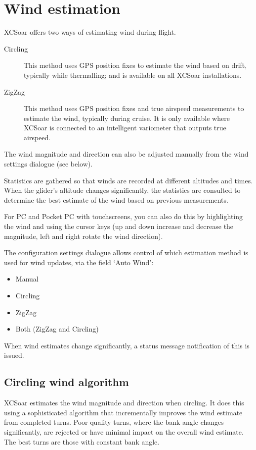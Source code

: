 \section{Wind estimation}\label{sec:wind-estimation}

XCSoar offers two ways of estimating wind during flight.
\begin{description}
\item[Circling]  This method uses GPS position fixes to estimate the wind
  based on drift, typically while thermalling; and is available on all
  XCSoar installations.
\item[ZigZag]  This method uses GPS position fixes and true airspeed measurements
  to estimate the wind, typically during cruise.  It is only available where
  XCSoar is connected to an intelligent variometer that outputs true airspeed.
\end{description}

The wind magnitude and direction can also be adjusted manually from the
wind settings dialogue (see below).  

Statistics are gathered so that winds are recorded at different
altitudes and times.  When the glider's altitude changes significantly,
the statistics are consulted to determine the best estimate of the
wind based on previous measurements.

For PC and Pocket PC with touchscreens, you can
also do this by highlighting the wind {\InfoBox} and using the cursor
keys (up and down increase and decrease the magnitude, left and right
rotate the wind direction).

The configuration  settings dialogue allows control of which
estimation method is used for wind updates, via the field `Auto Wind':
\begin{itemize}
\item Manual
\item Circling
\item ZigZag
\item Both (ZigZag and Circling)
\end{itemize}

When wind estimates change significantly, a status message
notification of this is issued.

\subsection*{Circling wind algorithm}

XCSoar estimates the wind magnitude and direction when circling.  It
does this using a sophisticated algorithm that incrementally improves
the wind estimate from completed turns.  Poor quality turns, where
the bank angle changes significantly, are rejected or have minimal
impact on the overall wind estimate.  The best turns are those with
constant bank angle.

